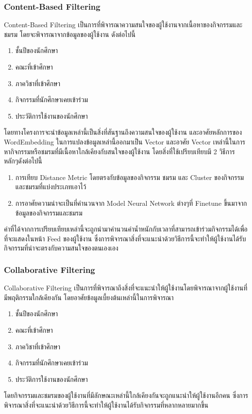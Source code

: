 \documentclass[14pt,oneside,openright,a4paper]{cpe-thai-project}
\begin{document}
\subsubsection{Content-Based Filtering}
Content-Based Filtering เป็นการที่พิจารณาความสนใจของผู้ใช้งานจากเนื้อหาของกิจกรรมและชมรม โดยจะพิจารณาจากข้อมูลของผู้ใช้งาน ดังต่อไปนี้
\begin{enumerate}
  \item ชั้นปีของนักศึกษา
  \item คณะที่เข้าศึกษา
  \item ภาควิชาที่เข้าศึกษา
  \item กิจกรรมที่นักศึกษาเคยเข้าร่วม
  \item ประวัติการใช้งานของนักศึกษา
\end{enumerate}
โดยทางโครงการจะนำข้อมูลเหล่านี้เป็นสิ่งที่สันฐานถึงความสนใจของผู้ใช้งาน และอาศัยหลักการของ WordEmbedding ในการแปลงข้อมูลเหล่านี้ออกมาเป็น Vector และอาศัย Vector เหล่านี้ในการหากิจกรรมหรือชมรมที่มีเนื้อหาใกล้เคียงกับสนใจของผู้ใช้งาน โดยสิ่งที่ใช้เปรียบเทียบมี 2 วิธีการหลักๆดังต่อไปนี้
\begin{enumerate}
  \item การเทียบ Distance Metric โดยตรงกับข้อมูลของกิจกรรม ชมรม และ Cluster ของกิจกรรมและชมรมที่แบ่งประเภทเอาไว้
  \item การอาศัยความน่าจะเป็นที่คำนวนจาก Model Neural Network ต่างๆที่ Finetune ขึ้นมาจากข้อมูลของกิจกรรมและชมรม
\end{enumerate}
ค่าที่ได้จากการเปรียบเทียบเหล่านี้จะถูกนำมาคำนวนค่าน้ำหนักกับเวลาที่สามารถเข้าร่วมกิจกรรมได้เพื่อที่จะแสดงในหน้า Feed ของผู้ใช้งาน ซึ่งการพิจารณาสิ่งที่จะแนะนำด้วยวิธีการนี้จะทำให้ผู้ใช้งานได้รับกิจกรรมที่น่าจะตรงกับความสนใจของตนเองเอง
\subsubsection{Collaborative Filtering}
Collaborative Filtering เป็นการที่พิจารณาถึงสิ่งที่จะแนะนำให้ผู้ใช้งานโดยพิจารณาจากผู้ใช้งานที่มีพฤติกรรมใกล้เคียงกัน โดยอาศัยข้อมูลเบี้ยงต้นเหล่านี้ในการพิจารณา
\begin{enumerate}
  \item ชั้นปีของนักศึกษา
  \item คณะที่เข้าศึกษา
  \item ภาควิชาที่เข้าศึกษา
  \item กิจกรรมที่นักศึกษาเคยเข้าร่วม
  \item ประวัติการใช้งานของนักศึกษา
\end{enumerate}
โดยกิจกรรมและชมรมของผู้ใช้งานที่มีลักษณะเหล่านี้ใกล้เคียงกันจะถูกแนะนำให้ผู้ใช้งานอีกคน ซึ่งการพิจารณาสิ่งที่จะแนะนำด้วยวิธีการนี้จะทำให้ผู้ใช้งานได้รับกิจกรรมที่หลากหลายมากขึ้น
\newpage
\end{document}

